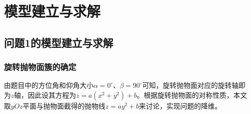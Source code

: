 \documentclass{cumcmthesis}
\begin{document}
\newpage
\section{模型建立与求解}
\subsection{问题1的模型建立与求解}
\subsubsection{旋转抛物面簇的确定}
由题目中的方位角和仰角大小$\alpha = 0^{\circ}$、$\beta = 90^{\circ}$可知，旋转抛物面对应的旋转轴即为$z$轴，因此设其方程为$z = a(x^2 + y^2)+b$。根据旋转抛物面的对称性质，本文取$yOz$平面与抛物面截得的抛物线$z = ay^2+b$来讨论，实现问题的降维。\par
\end{document}
